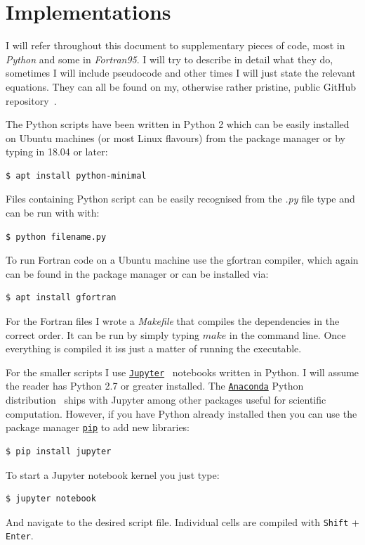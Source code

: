 \section{Implementations}

I will refer throughout this document to supplementary pieces of code, most in \emph{Python} and some in \emph{Fortran95}. I will try to describe in detail what they do, sometimes I will include pseudocode and other times I will just state the relevant equations. They can all be found on my, otherwise rather pristine, public GitHub repository~\cite{myGitHub}. 

The Python scripts have been written in Python 2 which can be easily installed on Ubuntu machines (or most Linux flavours) from the package manager or by typing in 18.04 or later:
\begin{verbatim}
$ apt install python-minimal
\end{verbatim}

Files containing Python script can be easily recognised from the \textit{.py} file type and can be run with with:
\begin{verbatim}
$ python filename.py
\end{verbatim}

To run Fortran code on a Ubuntu machine  use the gfortran compiler, which again can be found in the package manager or can be installed via:
\begin{verbatim}
$ apt install gfortran
\end{verbatim}

For the Fortran files I wrote a \textit{Makefile} that compiles the dependencies in the correct order. It can be run by simply typing $make$ in the command line. Once everything is compiled it iss just a matter of running the executable. 

For the smaller scripts I use \href{http://jupyter.org}{\texttt{Jupyter}}~\cite{Jupyter} notebooks written in Python. I will assume the reader has Python 2.7 or greater installed. The \href{https://anaconda.org/}{\texttt{Anaconda}} Python distribution~\cite{Conda} ships with Jupyter among other packages useful for scientific computation. However, if you have Python already installed then you can use the package manager \href{https://pypi.org/project/pip/}{\texttt{pip}} to add new libraries:
\begin{verbatim}
$ pip install jupyter
\end{verbatim}
To start a Jupyter notebook kernel you just type:
\begin{verbatim}
$ jupyter notebook
\end{verbatim}
And navigate to the desired script file. Individual cells are compiled with \texttt{Shift} + \texttt{Enter}.


